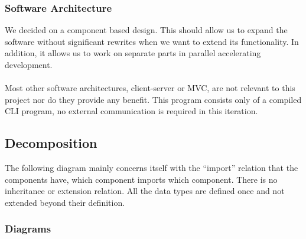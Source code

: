 \documentclass[11pt]{article}
\begin{document}
\subsubsection{Software Architecture}

We decided on a component based design. This should allow us to expand the
software without significant rewrites when we want to extend its functionality.
In addition, it allows us to work on separate parts in parallel accelerating
development.
\\\\
Most other software architectures, client-server or MVC, are not relevant to
this project nor do they provide any benefit. This program consists only of a
compiled CLI program, no external communication is required in this iteration.

\subsection{Decomposition}

The following diagram mainly concerns itself with the ``import'' relation that
the components have, which component imports which component. There is no
inheritance or extension relation. All the data types are defined once and not
extended beyond their definition.

\newpage
\subsubsection{Diagrams}
\end{document}

